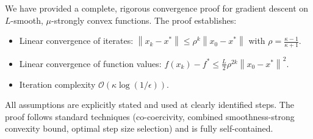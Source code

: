 \documentclass[11pt]{article}
\newcommand{\norm}[1]{\left\|#1\right\|}
\begin{document}
We have provided a complete, rigorous convergence proof for gradient descent on $L$-smooth, $\mu$-strongly convex functions. The proof establishes:
\begin{itemize}
    \item Linear convergence of iterates: $\norm{x_k - x^*} \le \rho^k \norm{x_0 - x^*}$ with $\rho = \frac{\kappa-1}{\kappa+1}$.
    \item Linear convergence of function values: $f(x_k) - f^* \le \frac{L}{2}\rho^{2k} \norm{x_0 - x^*}^2$.
    \item Iteration complexity $\mathcal{O}(\kappa \log(1/\epsilon))$.
\end{itemize}
All assumptions are explicitly stated and used at clearly identified steps. The proof follows standard techniques (co-coercivity, combined smoothness-strong convexity bound, optimal step size selection) and is fully self-contained.

\end{document}
